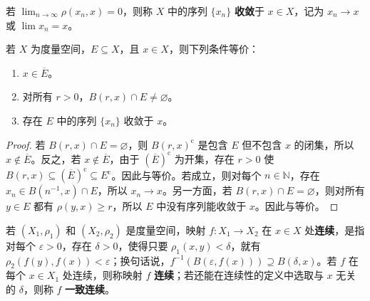\documentclass[../../main.tex]{subfiles}%
\begin{document}
\begin{definition}[序列的收敛]\label{definition:ch00-metric-convergence}
若 $\lim_{n\to\infty}\rho(x_n,x)=0$，则称 $X$ 中的序列 $\{x_n\}$ \textbf{收敛}于 $x\in X$，记为 $x_n\to x$ 或 $\lim x_n=x$。
\end{definition}


\begin{proposition}\label{proposition:ch00-closure-characterization}
若 $X$ 为度量空间，$E\subseteq X$，且 $x\in X$，则下列条件等价：
\begin{enumerate}[label=\alph*.,ref=(\alph*)]
\item\label{item:ch00-closure-member} $x\in\overline{E}$。
\item\label{item:ch00-closure-balls} 对所有 $r>0$，$B(r,x)\cap E\ne\varnothing$。
\item\label{item:ch00-closure-sequence} 存在 $E$ 中的序列 $\{x_n\}$ 收敛于 $x$。
\end{enumerate}
\end{proposition}

\begin{proof}
若 $B(r,x)\cap E=\varnothing$，则 $B(r,x)^{\mathrm{c}}$ 是包含 $E$ 但不包含 $x$ 的闭集，所以 $x\notin\overline{E}$。反之，若 $x\notin\overline{E}$，由于 $(\overline{E})^{\mathrm{c}}$ 为开集，存在 $r>0$ 使 $B(r,x)\subseteq(\overline{E})^{\mathrm{c}}\subseteq E^{\mathrm{c}}$。因此与等价。若成立，则对每个 $n\in\mathbb{N}$，存在 $x_n\in B(n^{-1},x)\cap E$，所以 $x_n\to x$。另一方面，若 $B(r,x)\cap E=\varnothing$，则对所有 $y\in E$ 都有 $\rho(y,x)\geqslant r$，所以 $E$ 中没有序列能收敛于 $x$。因此与等价。
\end{proof}


\begin{definition}[连续与一致连续]\label{definition:ch00-continuity-definition}
若 $(X_1,\rho_1)$ 和 $(X_2,\rho_2)$ 是度量空间，映射 $f:X_1\to X_2$ 在 $x\in X$ 处\textbf{连续}，是指对每个 $\varepsilon>0$，存在 $\delta>0$，使得只要 $\rho_1(x,y)<\delta$，就有 $\rho_2(f(y),f(x))<\varepsilon$；换句话说，$f^{-1}(B(\varepsilon,f(x)))\supseteq B(\delta,x)$。若 $f$ 在每个 $x\in X_1$ 处连续，则称映射 $f$ \textbf{连续}；若还能在连续性的定义中选取与 $x$ 无关的 $\delta$，则称 $f$ \textbf{一致连续}。
\end{definition}
\end{document}
